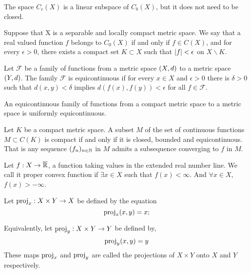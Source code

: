 The space $C_c(X)$ is a linear subspace of $C_b(X)$, but it does not need to be closed. 

\begin{definition}
	Suppose that X is a separable and locally compact metric space.	We say that a real valued function $f$ belongs to $C_0(X)$ if and only if $f\in C(X)$, and for every $\epsilon >0$, there exists a compact set $K\subset X$ such that $\left| f \right|<\epsilon$ on $X\backslash K$. 
\end{definition}

\begin{definition}
	Let $\mathcal F$ be a family of functions from a metric space $\left( X, d \right)$ to a metric space $\left( Y, d \right)$. The family $\mathcal{F}$ is equicontinuous if for every $x\in X$ and $\epsilon > 0$ there is $\delta >0$ such that $d(x,y)<\delta$ implies $d(f(x), f(y))<\epsilon$ for all $f\in \mathcal F$.
\end{definition}

\begin{theorem}
	An equicontinuous family of functions from a compact metric space to a metric space is uniformly equicontinuous. 
\end{theorem}

\begin{theorem}
	Let $K$ be a compact metric space. A subset $M$ of the set of continuous functions $M\subset C(K)$ is compact if and only if it is closed, bounded and equicontinuous. That is any sequence $(f_n)_{n\in\mathbb{N}}$ in $M$ admits a subsequence converging to $f$ in $M$.
\end{theorem} 


\begin{definition}
	Let $f: X\rightarrow\overline{\mathbb{R}}$, a function taking values in the extended real number line. We call it proper convex function if $\exists x \in X$ such that $f(x)<\infty$. And $\forall x \in X$, $f(x)>-\infty$.
\end{definition}

\begin{definition}
	Let $\mathrm{proj}_x: X\times Y \rightarrow X$ be defined by the equation
	\begin{equation*}
		\mathrm{proj}_x(x,y)= x;
	\end{equation*}
	
	Equivalently, let $\mathrm{proj}_y: X\times Y \rightarrow Y$ be defined by,
	\begin{equation*}
		\mathrm{proj}_y(x,y)=y
	\end{equation*}
	These maps $\mathrm{proj}_x$ and $\mathrm{proj}_y$ are called the projections of $X\times Y$ onto $X$ and $Y$ respectively.	
\end{definition}

